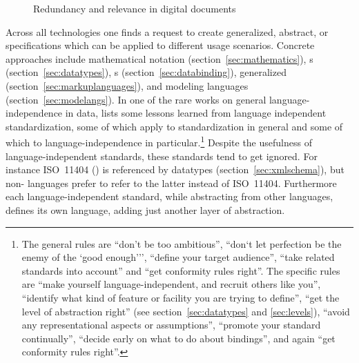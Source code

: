 \begin{figure}
\centering
{}
\caption[Redundancy and relevance in digital documents]{%
         Redundancy and relevance in digital documents\footnotemark}
\label{fig:redrel}
\end{figure}


Across all technologies one finds a request to create generalized, abstract, or
 specifications which can be
applied to different usage scenarios. Concrete approaches include mathematical
notation (section~\ref{sec:mathematics}), s
(section~\ref{sec:datatypes}), s
(section~\ref{sec:databinding}), generalized 
(section~\ref{sec:markuplanguages}), and modeling languages
(section~\ref{sec:modelangs}). In one of the rare works on general
language-independence in data, \textcite{Meek1995} lists some lessons learned
from language independent standardization, some of which apply to
standardization in general and some of which to language-independence in
particular.\footnote{The general rules are ``don't be too ambitious'', ``don`t
let perfection be the enemy of the `good enough''', ``define your target
audience'', ``take related standards into account'' and ``get conformity rules
right''. The specific rules are ``make yourself language-independent, and
recruit others like you'', ``identify what kind of feature or facility you are
trying to define'', ``get the level of abstraction right'' (see
section~\ref{sec:datatypes} and \ref{sec:levels}), ``avoid any representational
aspects or assumptions'',  ``promote your standard continually'', ``decide
early on what to do about bindings'', and again ``get conformity rules right''.}
Despite the usefulness of language-independent standards, these standards tend to
get ignored. For instance ISO~11404 (\citeyear{ISO11404}) is referenced by
 datatypes (section~\ref{sec:xmlschema}), but non- 
languages prefer to refer to the latter instead of ISO~11404. Furthermore
each language-independent standard, while abstracting from other languages, 
defines its own language, adding just another layer of abstraction.

